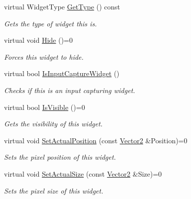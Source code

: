 \begin{DoxyCompactItemize}
virtual WidgetType \hyperlink{classphys_1_1UI_1_1Widget_a76337b279bd372ce225f94ab1da191ea}{GetType} () const 
\begin{DoxyCompactList}\small\item\em Gets the type of widget this is. \item\end{DoxyCompactList}\item 
\hypertarget{classphys_1_1UI_1_1Widget_abc8e3f88f780e3b36b38086c45311795}{
virtual void \hyperlink{classphys_1_1UI_1_1Widget_abc8e3f88f780e3b36b38086c45311795}{Hide} ()=0}
\label{classphys_1_1UI_1_1Widget_abc8e3f88f780e3b36b38086c45311795}

\begin{DoxyCompactList}\small\item\em Forces this widget to hide. \item\end{DoxyCompactList}\item 
virtual bool \hyperlink{classphys_1_1UI_1_1Widget_af8498cbe2d6cf37115cf8ade52e22557}{IsInputCaptureWidget} ()
\begin{DoxyCompactList}\small\item\em Checks if this is an input capturing widget. \item\end{DoxyCompactList}\item 
virtual bool \hyperlink{classphys_1_1UI_1_1Widget_aaf1a1bd31b8e626467ce9cdb69bdf7ac}{IsVisible} ()=0
\begin{DoxyCompactList}\small\item\em Gets the visibility of this widget. \item\end{DoxyCompactList}\item 
virtual void \hyperlink{classphys_1_1UI_1_1Widget_a77727351d98b10f1f4eb45048cb882e3}{SetActualPosition} (const \hyperlink{classphys_1_1Vector2}{Vector2} \&Position)=0
\begin{DoxyCompactList}\small\item\em Sets the pixel position of this widget. \item\end{DoxyCompactList}\item 
virtual void \hyperlink{classphys_1_1UI_1_1Widget_acda63a62fa158d5fe00c86f50e5c120d}{SetActualSize} (const \hyperlink{classphys_1_1Vector2}{Vector2} \&Size)=0
\begin{DoxyCompactList}\small\item\em Sets the pixel size of this widget. \item\end{DoxyCompactList}\item 

\end{DoxyCompactItemize}
